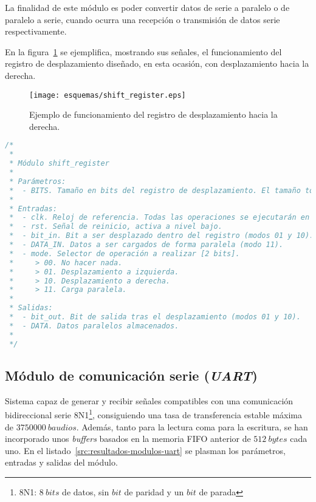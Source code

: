 La finalidad de este módulo es poder convertir datos de serie a paralelo o de paralelo a serie, cuando ocurra una recepción o transmisión de datos serie respectivamente.

En la figura~\ref{fig:shift_esquema} se ejemplifica, mostrando sus señales, el funcionamiento del registro de desplazamiento diseñado, en esta ocasión, con desplazamiento hacia la derecha.

\begin{figure}[htb]
    \centering
    \texttt{[image: esquemas/shift\_register.eps]}
    \caption{Ejemplo de funcionamiento del registro de desplazamiento hacia la derecha.}
    \label{fig:shift_esquema}
\end{figure}

\begin{lstlisting}[language=Verilog,
    caption={Parámetros, entradas y salidas del módulo shift\_register.},
    label=src:resultados-modulos-shift]
/*
 *
 * Módulo shift_register
 *
 * Parámetros:
 *  - BITS. Tamaño en bits del registro de desplazamiento. El tamaño total será de BITS + 1 (bit de salida).
 *
 * Entradas:
 *  - clk. Reloj de referencia. Todas las operaciones se ejecutarán en el flanqueo de subida.
 *  - rst. Señal de reinicio, activa a nivel bajo.
 *  - bit_in. Bit a ser desplazado dentro del registro (modos 01 y 10).
 *  - DATA_IN. Datos a ser cargados de forma paralela (modo 11).
 *  - mode. Selector de operación a realizar [2 bits].
 *     > 00. No hacer nada.
 *     > 01. Desplazamiento a izquierda.
 *     > 10. Desplazamiento a derecha.
 *     > 11. Carga paralela.
 *
 * Salidas:
 *  - bit_out. Bit de salida tras el desplazamiento (modos 01 y 10).
 *  - DATA. Datos paralelos almacenados.
 *
 */
\end{lstlisting}


\subsection{Módulo de comunicación serie (\emph{UART})}
Sistema capaz de generar y recibir señales compatibles con una comunicación bidireccional serie 8N1\footnote{8N1: $8~bits$ de datos, sin $bit$ de paridad y un $bit$ de parada}, consiguiendo una tasa de transferencia estable máxima de $3750000~baudios$. Además, tanto para la lectura coma para la escritura, se han incorporado unos \emph{buffers} basados en la memoria FIFO anterior de $512~bytes$ cada uno. En el listado~\ref{src:resultados-modulos-uart} se plasman los parámetros, entradas y salidas del módulo.

